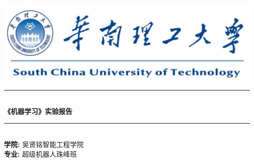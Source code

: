 \documentclass[journal, a4paper]{IEEEtran}
\begin{document}
\begin{CJK}{UTF8}{gbsn}

\begin{titlepage}

\newcommand{\HRule}{\rule{\linewidth}{0.5mm}} %

\center %

~\\[1cm]
\includegraphics{SCUT.png}\\[2cm] %


\HRule \\[1cm]
{ \huge \bfseries 《机器学习》实验报告 }\\[0.6cm] %
\HRule \\[2cm]


\textsc{\LARGE \textbf{学院:} 吴贤铭智能工程学院}\\[1cm]
\textsc{\LARGE \textbf{专业:} 超级机器人珠峰班}\\[2cm]




\end{titlepage}
\end{CJK}
\end{document}
